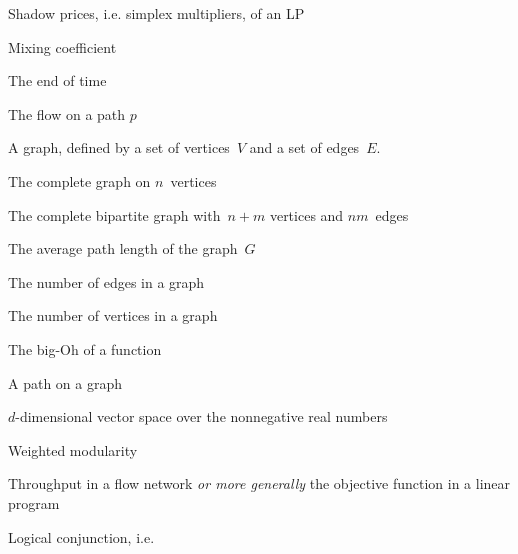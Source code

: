
\item[$\lambda$] Shadow prices, i.e. simplex multipliers, of an LP
\item[$\mu$] Mixing coefficient
\item[$\Omega$] The end of time

\item[$f_p$] The flow on a path $p$
\item[$G$] A graph, defined by a set of vertices~$V$ and a set of edges~$E$.
\item[$K_n$] The complete graph on $n$~vertices
\item[$K_{m,n}$] The complete bipartite graph with~$n + m$ vertices and $nm$~edges
\item[$l_G$] The average path length of the graph~$G$
\item[$M$] The number of edges in a graph
\item[$N$] The number of vertices in a graph
\item[$O$] The big-Oh of a function
\item[$p$] A path on a graph
\item[$\mathbb{R}_{\geq 0}^d$] $d$-dimensional vector space over the nonnegative real numbers
\item[$Q$] Weighted modularity~\cite{newman2006modularity}
\item[$z$] Throughput in a flow network \emph{or more generally} the objective function in a linear program
\item[$\land$] Logical conjunction, i.e.\ 